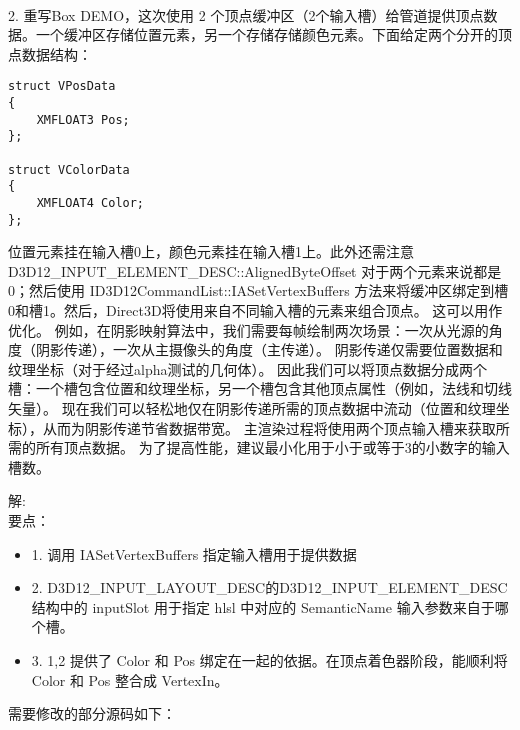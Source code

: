 \begin{flushleft}
~\\
2. 重写Box DEMO，这次使用 2 个顶点缓冲区（2个输入槽）给管道提供顶点数据。一个缓冲区存储位置元素，另一个存储存储颜色元素。下面给定两个分开的顶点数据结构：\\
\end{flushleft}
\begin{lstlisting}
struct VPosData
{
    XMFLOAT3 Pos;
};

struct VColorData
{
    XMFLOAT4 Color;
};
\end{lstlisting}
\begin{flushleft}
位置元素挂在输入槽0上，颜色元素挂在输入槽1上。此外还需注意 D3D12\_INPUT\_ELEMENT\_DESC::AlignedByteOffset 对于两个元素来说都是0；然后使用 ID3D12CommandList::IASetVertexBuffers 方法来将缓冲区绑定到槽0和槽1。然后，Direct3D将使用来自不同输入槽的元素来组合顶点。 这可以用作优化。 例如，在阴影映射算法中，我们需要每帧绘制两次场景：一次从光源的角度（阴影传递），一次从主摄像头的角度（主传递）。 阴影传递仅需要位置数据和纹理坐标（对于经过alpha测试的几何体）。 因此我们可以将顶点数据分成两个槽：一个槽包含位置和纹理坐标，另一个槽包含其他顶点属性（例如，法线和切线矢量）。 现在我们可以轻松地仅在阴影传递所需的顶点数据中流动（位置和纹理坐标），从而为阴影传递节省数据带宽。 主渲染过程将使用两个顶点输入槽来获取所需的所有顶点数据。 为了提高性能，建议最小化用于小于或等于3的小数字的输入槽数。\\
\end{flushleft}
\begin{flushleft}
解:\\
要点：\\
\begin{itemize}
  \item 1. 调用 IASetVertexBuffers 指定输入槽用于提供数据
  \item 2. D3D12_INPUT_LAYOUT_DESC的D3D12_INPUT_ELEMENT_DESC 结构中的 inputSlot 用于指定 hlsl 中对应的 SemanticName 输入参数来自于哪个槽。
  \item 3. 1,2 提供了 Color 和 Pos 绑定在一起的依据。在顶点着色器阶段，能顺利将 Color 和 Pos 整合成 VertexIn。
\end{itemize}
需要修改的部分源码如下：\\
\end{flushleft}

